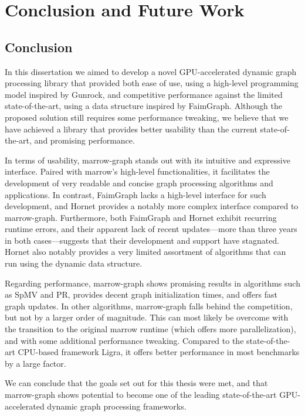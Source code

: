 %

\chapter{Conclusion and Future Work}

\section{Conclusion}

In this dissertation we aimed to develop a novel \gls{GPU}-accelerated dynamic graph processing library that provided both ease of use, using a high-level programming model inspired by Gunrock, and competitive performance against the limited state-of-the-art, using a data structure inspired by FaimGraph. Although the proposed solution still requires some performance tweaking, we believe that we have achieved a library that provides better usability than the current state-of-the-art, and promising performance. 

In terms of usability, marrow-graph stands out with its intuitive and expressive interface. Paired with marrow's high-level functionalities, it facilitates the development of very readable and concise graph processing algorithms and applications. In contrast, FaimGraph lacks a high-level interface for such development, and Hornet provides a notably more complex interface compared to marrow-graph. Furthermore, both FaimGraph and Hornet exhibit recurring runtime errors, and their apparent lack of recent updates—more than three years in both cases—suggests that their development and support have stagnated. Hornet also notably provides a very limited assortment of algorithms that can run using the dynamic data structure.

Regarding performance, marrow-graph shows promising results in algorithms such as \gls{SpMV} and \gls{PR}, provides decent graph initialization times, and offers fast graph updates.
In other algorithms, marrow-graph falls behind the competition, but not by a larger order of magnitude. This can most likely be overcome with the transition to the original marrow runtime (which offers more parallelization), and with some additional performance tweaking. Compared to the state-of-the-art \gls{CPU}-based framework Ligra, it offers better performance in most benchmarks by a large factor.

We can conclude that the goals set out for this thesis were met, and that marrow-graph 
shows potential to become one of the leading state-of-the-art \gls{GPU}-accelerated dynamic graph processing frameworks.

